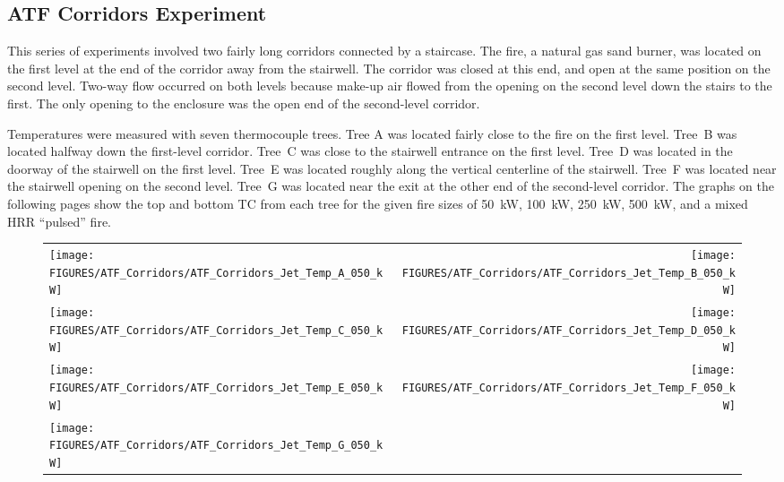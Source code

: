\clearpage

\subsection{ATF Corridors Experiment}

This series of experiments involved two fairly long corridors connected by a staircase. The fire, a natural gas sand burner, was located on the first level at the end of the corridor away from the stairwell. The corridor was closed at this end, and open at the same position on the
second level. Two-way flow occurred on both levels because make-up air flowed from the opening on the second level down
the stairs to the first. The only opening to the enclosure was the open end of the second-level corridor.

Temperatures were measured with seven thermocouple trees. Tree A was located fairly close to the fire on the first level. Tree~B
was located halfway down the first-level corridor. Tree~C was close to the stairwell entrance on the first level. Tree~D was located
in the doorway of the stairwell on the first level. Tree~E was located roughly along the vertical centerline of the
stairwell. Tree~F was located near the stairwell opening on the second level. Tree~G was located near the exit at the
other end of the second-level corridor. The graphs on the following pages show the top and bottom TC from each tree for
the given fire sizes of 50~kW, 100~kW, 250~kW, 500~kW, and a mixed HRR ``pulsed'' fire.

\begin{figure}[p]
\begin{tabular*}{\textwidth}{l@{\extracolsep{\fill}}r}
\texttt{[image: FIGURES/ATF\_Corridors/ATF\_Corridors\_Jet\_Temp\_A\_050\_kW]} &
\texttt{[image: FIGURES/ATF\_Corridors/ATF\_Corridors\_Jet\_Temp\_B\_050\_kW]} \\
\texttt{[image: FIGURES/ATF\_Corridors/ATF\_Corridors\_Jet\_Temp\_C\_050\_kW]} &
\texttt{[image: FIGURES/ATF\_Corridors/ATF\_Corridors\_Jet\_Temp\_D\_050\_kW]} \\
\texttt{[image: FIGURES/ATF\_Corridors/ATF\_Corridors\_Jet\_Temp\_E\_050\_kW]} &
\texttt{[image: FIGURES/ATF\_Corridors/ATF\_Corridors\_Jet\_Temp\_F\_050\_kW]} \\
\texttt{[image: FIGURES/ATF\_Corridors/ATF\_Corridors\_Jet\_Temp\_G\_050\_kW]} &
\end{tabular*}
\label{ATF_Corridors_Jet_Temp_50_kW}
\end{figure}

